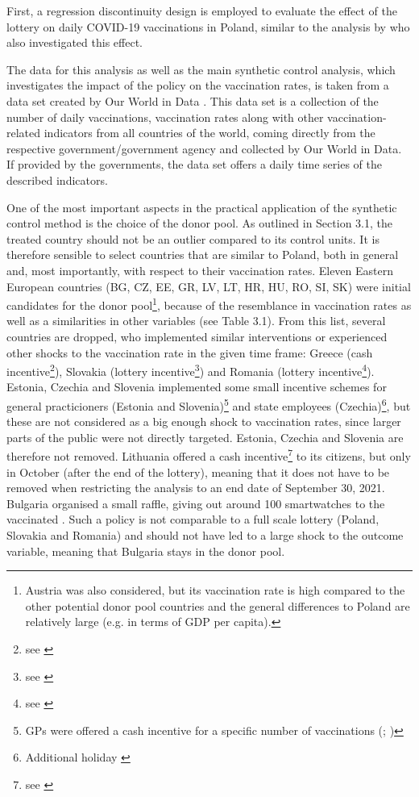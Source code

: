 \documentclass{scrbook}
\begin{document}
First, a regression discontinuity design is employed to evaluate the
effect of the lottery on daily COVID-19 vaccinations in Poland, similar
to the analysis by \textcite{kuznetsova_effectiveness_2022} who also
investigated this effect.

The data for this analysis as well as the main synthetic control
analysis, which investigates the impact of the policy on the vaccination
rates, is taken from a data set created by Our World in Data
\parencite{mathieu_global_2021}. This data set is a collection of the
number of daily vaccinations, vaccination rates along with other
vaccination-related indicators from all countries of the world, coming
directly from the respective government/government agency and collected
by Our World in Data. If provided by the governments, the data set
offers a daily time series of the described indicators.

One of the most important aspects in the practical application of the
synthetic control method is the choice of the donor pool. As outlined in
Section 3.1, the treated country should not be an outlier compared to
its control units. It is therefore sensible to select countries that are
similar to Poland, both in general and, most importantly, with respect
to their vaccination rates. Eleven Eastern European countries (BG, CZ,
EE, GR, LV, LT, HR, HU, RO, SI, SK) were initial candidates for the
donor
pool\footnote{Austria was also considered, but its vaccination rate is high compared to the other potential donor pool countries and the general differences to Poland are relatively large (e.g. in terms of GDP per capita).},
because of the resemblance in vaccination rates as well as a
similarities in other variables (see Table 3.1). From this list, several
countries are dropped, who implemented similar interventions or
experienced other shocks to the vaccination rate in the given time
frame: Greece (cash
incentive\footnote{see \textcite{koutantou_greece_2021}}), Slovakia
(lottery incentive\footnote{see \textcite{lopatka_slovaks_2021}}) and
Romania (lottery
incentive\footnote{see \textcite{health_ministry_of_romania_press_2021}}).
Estonia, Czechia and Slovenia implemented some small incentive schemes
for general practicioners (Estonia and
Slovenia)\footnote{GPs were offered a cash incentive for a specific number of vaccinations (\cite{baltic_news_network_estonia_2021}; \cite{slovenia_times_government_2021})}
and state employees
(Czechia)\footnote{Additional holiday \parencite{euronews_czech_2021}},
but these are not considered as a big enough shock to vaccination rates,
since larger parts of the public were not directly targeted. Estonia,
Czechia and Slovenia are therefore not removed. Lithuania offered a cash
incentive\footnote{see \textcite{lithuanian_national_radio_and_television_lithuanian_2021}}
to its citizens, but only in October (after the end of the lottery),
meaning that it does not have to be removed when restricting the
analysis to an end date of September 30, 2021. Bulgaria organised a
small raffle, giving out around 100 smartwatches to the vaccinated
\parencite{radio_bulgaria_bulgarias_2021}. Such a policy is not
comparable to a full scale lottery (Poland, Slovakia and Romania) and
should not have led to a large shock to the outcome variable, meaning
that Bulgaria stays in the donor pool.
\end{document}
